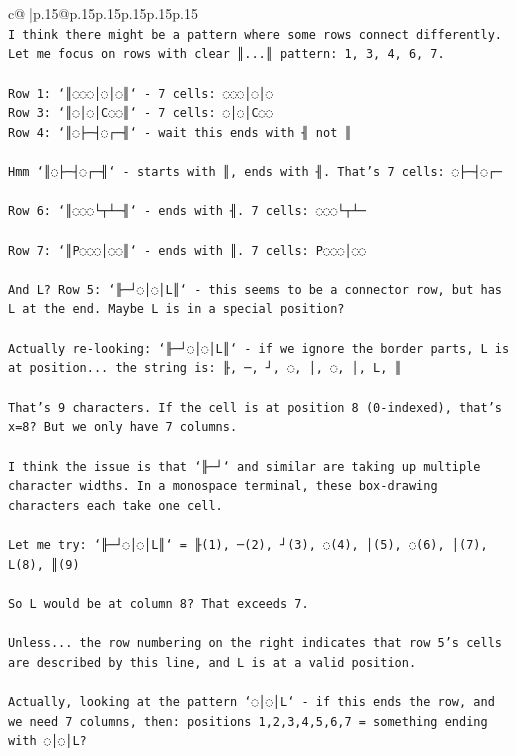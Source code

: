 \documentclass{article}
\begin{document}
{\begin{supertabular}{c@{$\;$}|p{.15\linewidth}@{}p{.15\linewidth}p{.15\linewidth}p{.15\linewidth}p{.15\linewidth}p{.15\linewidth}}
{{{\\ 
\texttt{I think there might be a pattern where some rows connect differently. Let me focus on rows with clear ║...║ pattern: 1, 3, 4, 6, 7.} \\
\\ 
\texttt{Row 1: `║◌◌◌│◌│◌║` {-} 7 cells: ◌◌◌│◌│◌} \\
\texttt{Row 3: `║◌│◌│C◌◌║` {-} 7 cells: ◌│◌│C◌◌} \\
\texttt{Row 4: `║◌├─┤◌┌─╢` {-} wait this ends with ╢ not ║} \\
\\ 
\texttt{Hmm `║◌├─┤◌┌─╢` {-} starts with ║, ends with ╢. That's 7 cells: ◌├─┤◌┌─} \\
\\ 
\texttt{Row 6: `║◌◌◌└┬┴─╢` {-} ends with ╢. 7 cells: ◌◌◌└┬┴─} \\
\\ 
\texttt{Row 7: `║P◌◌◌│◌◌║` {-} ends with ║. 7 cells: P◌◌◌│◌◌} \\
\\ 
\texttt{And L? Row 5: `╟─┘◌│◌│L║` {-} this seems to be a connector row, but has L at the end. Maybe L is in a special position?} \\
\\ 
\texttt{Actually re{-}looking: `╟─┘◌│◌│L║` {-} if we ignore the border parts, L is at position... the string is: ╟, ─, ┘, ◌, │, ◌, │, L, ║} \\
\\ 
\texttt{That's 9 characters. If the cell is at position 8 (0{-}indexed), that's x=8? But we only have 7 columns.} \\
\\ 
\texttt{I think the issue is that `╟─┘` and similar are taking up multiple character widths. In a monospace terminal, these box{-}drawing characters each take one cell.} \\
\\ 
\texttt{Let me try: `╟─┘◌│◌│L║` = ╟(1), ─(2), ┘(3), ◌(4), │(5), ◌(6), │(7), L(8), ║(9)} \\
\\ 
\texttt{So L would be at column 8? That exceeds 7.} \\
\\ 
\texttt{Unless... the row numbering on the right indicates that row 5's cells are described by this line, and L is at a valid position.} \\
\\ 
\texttt{Actually, looking at the pattern `◌│◌│L` {-} if this ends the row, and we need 7 columns, then: positions 1,2,3,4,5,6,7 = something ending with ◌│◌│L?} \\
}}}
\end{supertabular}}
\end{document}
